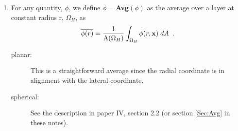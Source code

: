 \begin{enumerate}

\item For any quantity, $\phi$, we define $\overline{\phi} = ${\bf Avg}$(\phi)$
as the average over a layer at constant radius r, $\Omega_H$, as
\begin{equation}
\overline{\phi(r)}
= \frac{1}{\mathrm{A}(\Omega_H)}\int_{\Omega_H} \phi(r,{\bf x}) \; dA \enskip .
\end{equation}
\begin{description}
\item[planar:] This is a straightforward average since the radial coordinate is 
in alignment with the lateral coordinate.
\item[spherical:] See the description in paper IV, section 2.2 
(or section \ref{Sec:Avg} in these notes).
\end{description}


\end{enumerate}
